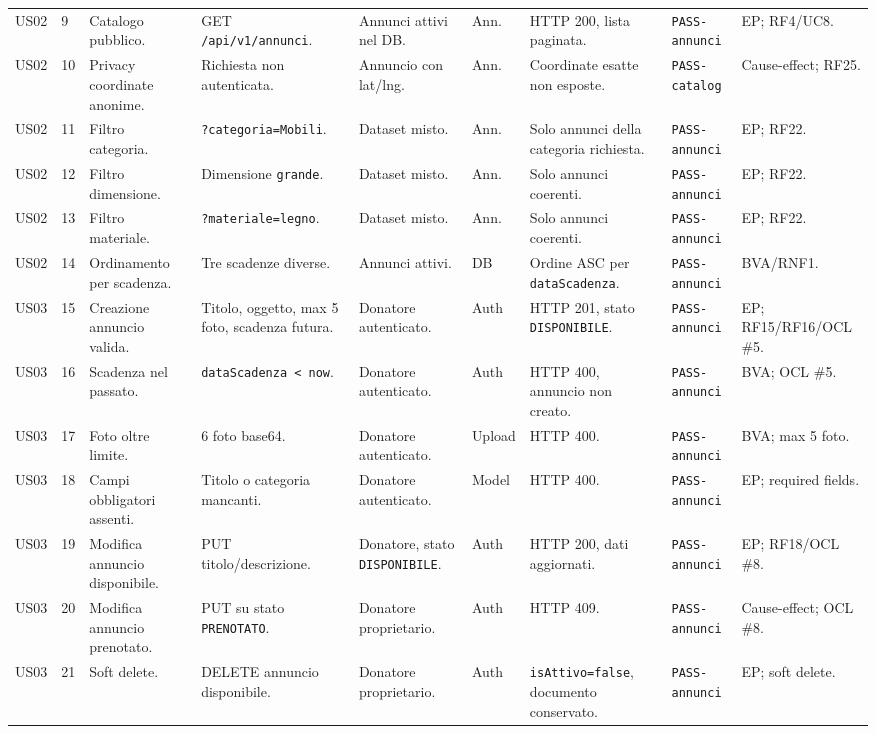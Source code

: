 \documentclass[11pt,a4paper]{article}
\newcommand{\code}[1]{\texttt{#1}}
\begin{document}
\begin{longtable}{L{1.2cm}C{0.45cm}L{2.35cm}L{2.05cm}L{1.95cm}L{0.9cm}L{2.3cm}L{1.55cm}L{2.05cm}}
US02 & 9 & Catalogo pubblico. & GET \code{/api/v1/annunci}. & Annunci attivi nel DB. & Ann. & HTTP 200, lista paginata. & \code{PASS-annunci} & EP; RF4/UC8. \\
US02 & 10 & Privacy coordinate anonime. & Richiesta non autenticata. & Annuncio con lat/lng. & Ann. & Coordinate esatte non esposte. & \code{PASS-catalog} & Cause-effect; RF25. \\
US02 & 11 & Filtro categoria. & \code{?categoria=Mobili}. & Dataset misto. & Ann. & Solo annunci della categoria richiesta. & \code{PASS-annunci} & EP; RF22. \\
US02 & 12 & Filtro dimensione. & Dimensione \code{grande}. & Dataset misto. & Ann. & Solo annunci coerenti. & \code{PASS-annunci} & EP; RF22. \\
US02 & 13 & Filtro materiale. & \code{?materiale=legno}. & Dataset misto. & Ann. & Solo annunci coerenti. & \code{PASS-annunci} & EP; RF22. \\
US02 & 14 & Ordinamento per scadenza. & Tre scadenze diverse. & Annunci attivi. & DB & Ordine ASC per \code{dataScadenza}. & \code{PASS-annunci} & BVA/RNF1. \\

US03 & 15 & Creazione annuncio valida. & Titolo, oggetto, max 5 foto, scadenza futura. & Donatore autenticato. & Auth & HTTP 201, stato \code{DISPONIBILE}. & \code{PASS-annunci} & EP; RF15/RF16/OCL \#5. \\
US03 & 16 & Scadenza nel passato. & \code{dataScadenza < now}. & Donatore autenticato. & Auth & HTTP 400, annuncio non creato. & \code{PASS-annunci} & BVA; OCL \#5. \\
US03 & 17 & Foto oltre limite. & 6 foto base64. & Donatore autenticato. & Upload & HTTP 400. & \code{PASS-annunci} & BVA; max 5 foto. \\
US03 & 18 & Campi obbligatori assenti. & Titolo o categoria mancanti. & Donatore autenticato. & Model & HTTP 400. & \code{PASS-annunci} & EP; required fields. \\
US03 & 19 & Modifica annuncio disponibile. & PUT titolo/descrizione. & Donatore, stato \code{DISPONIBILE}. & Auth & HTTP 200, dati aggiornati. & \code{PASS-annunci} & EP; RF18/OCL \#8. \\
US03 & 20 & Modifica annuncio prenotato. & PUT su stato \code{PRENOTATO}. & Donatore proprietario. & Auth & HTTP 409. & \code{PASS-annunci} & Cause-effect; OCL \#8. \\
US03 & 21 & Soft delete. & DELETE annuncio disponibile. & Donatore proprietario. & Auth & \code{isAttivo=false}, documento conservato. & \code{PASS-annunci} & EP; soft delete. \\


\end{longtable}
\end{document}
